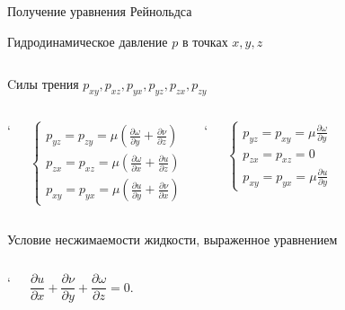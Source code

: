 \documentclass[ignoreonframetext,unicode]{beamer}
\begin{document}
\begin{frame}{Получение уравнения Рейнольдса}
\begin{block}{Гидродинамическое давление $p$ в
			точках $x, y, z$}
\begin{columns}
	\end{columns}

	\end{block}
		
		
		\vspace*{-3mm}
		\begin{block}{Cилы трения $p_{xy}, p_{xz}, p_{yx}, p_{yz}, p_{zx}, p_{zy}$}
			\vspace*{-12mm}
			\begin{columns}
				`	
				\begin{minipage}[t]{\linewidth}
					\begin{equation*}
						\label{eqsi}
					\begin{cases}
						p_{yz} = p_{zy} = \mu \left(\frac{\partial \omega}{\partial y} + \frac{\partial \nu}{\partial z} \right) \\
						p_{zx} = p_{xz} = \mu \left( \frac{\partial \omega}{\partial x} +  \frac{\partial u}{\partial z} \right) \\
						p_{xy} = p_{yx} = \mu \left(  \frac{\partial u}{\partial y} + \frac{\partial \nu}{\partial x} \right)
					\end{cases}
					\end{equation*}
				\end{minipage}
				
				
				`
				\begin{minipage}[t]{\linewidth}
					
					
					\begin{equation*}
					\label{secinitialeq}
					\begin{cases}
						p_{yz} = p_{xy} = \mu \frac{\partial \omega}{\partial y} \\
						p_{zx} = p_{xz} = 0 \\
						p_{xy} = p_{yx} = \mu \frac{\partial u}{\partial y}
					\end{cases}
					\end{equation*}
				\end{minipage}
		
				
			\end{columns}
			
		\end{block}
	
	\vspace*{-3mm}
	\begin{block}{Условие несжимаемости жидкости, выраженное уравнением}
		\vspace*{-6mm}
		\begin{columns}
			\column{0.4\textwidth}`	
			\begin{minipage}[t]{0.5\linewidth}
				\begin{equation*}
						\label{eqthi}
					\frac{\partial u}{\partial x} + \frac{\partial \nu}{\partial y} + \frac{\partial \omega}{\partial z} = 0.
				\end{equation*}
			\end{minipage}
			

\end{columns}
\end{block}
\end{frame}
\end{document}
